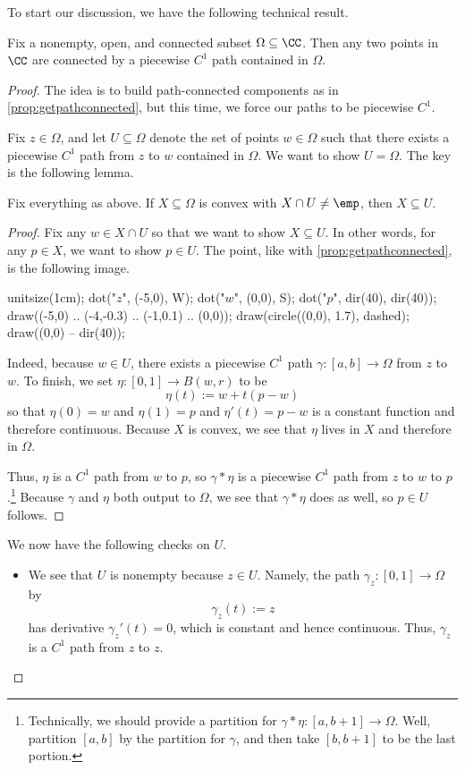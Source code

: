 To start our discussion, we have the following technical result.
\begin{lemma}
	Fix a nonempty, open, and connected subset $\Omega\subseteq\CC$. Then any two points in $\CC$ are connected by a piecewise $C^1$ path contained in $\Omega$.
\end{lemma}
\begin{proof}
	The idea is to build path-connected components as in \autoref{prop:getpathconnected}, but this time, we force our paths to be piecewise $C^1$.

	Fix $z\in\Omega$, and let $U\subseteq\Omega$ denote the set of points $w\in \Omega$ such that there exists a piecewise $C^1$ path from $z$ to $w$ contained in $\Omega$. We want to show $U=\Omega$. The key is the following lemma.
	\begin{lemma} \label{lem:convexinconnectedcomp}
		Fix everything as above. If $X\subseteq\Omega$ is convex with $X\cap U\ne\emp$, then $X\subseteq U$.
	\end{lemma}
	\begin{proof}
		Fix any $w\in X\cap U$ so that we want to show $X\subseteq U$. In other words, for any $p\in X$, we want to show $p\in U$. The point, like with \autoref{prop:getpathconnected}, is the following image.
		\begin{center}
			\begin{asy}
				unitsize(1cm);
				dot("$z$", (-5,0), W);
				dot("$w$", (0,0), S);
				dot("$p$", dir(40), dir(40));
				draw((-5,0) .. (-4,-0.3) .. (-1,0.1) .. (0,0));
				draw(circle((0,0), 1.7), dashed);
				draw((0,0) -- dir(40));
			\end{asy}
		\end{center}
		Indeed, because $w\in U$, there exists a piecewise $C^1$ path $\gamma:[a,b]\to\Omega$ from $z$ to $w$. To finish, we set $\eta:[0,1]\to B(w,r)$ to be
		\[\eta(t):=w+t(p-w)\]
		so that $\eta(0)=w$ and $\eta(1)=p$ and $\eta'(t)=p-w$ is a constant function and therefore continuous. Because $X$ is convex, we see that $\eta$ lives in $X$ and therefore in $\Omega$.
		
		Thus, $\eta$ is a $C^1$ path from $w$ to $p$, so $\gamma*\eta$ is a piecewise $C^1$ path from $z$ to $w$ to $p$.\footnote{Technically, we should provide a partition for $\gamma*\eta:[a,b+1]\to\Omega$. Well, partition $[a,b]$ by the partition for $\gamma$, and then take $[b,b+1]$ to be the last portion.} Because $\gamma$ and $\eta$ both output to $\Omega$, we see that $\gamma*\eta$ does as well, so $p\in U$ follows.
	\end{proof}
	We now have the following checks on $U$.
	\begin{itemize}
		\item We see that $U$ is nonempty because $z\in U$. Namely, the path $\gamma_z:[0,1]\to\Omega$ by
		\[\gamma_z(t):=z\]
		has derivative $\gamma_z'(t)=0$, which is constant and hence continuous. Thus, $\gamma_z$ is a $C^1$ path from $z$ to $z$.


\end{itemize}
\end{proof}
